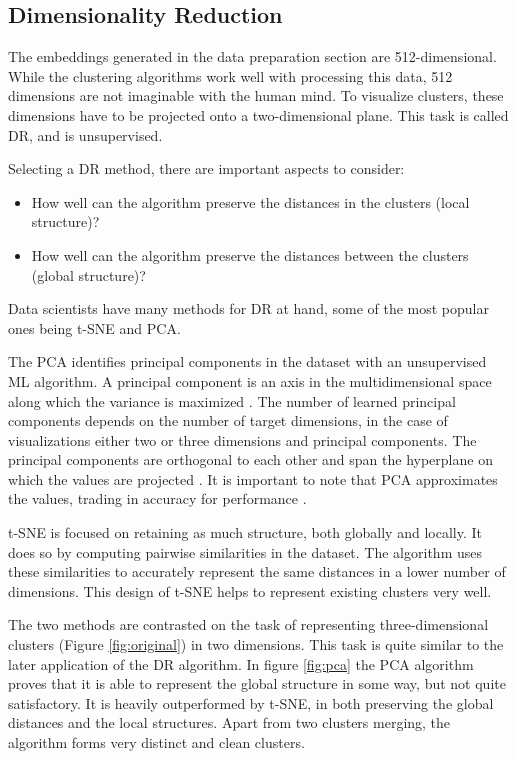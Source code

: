 \subsection{Dimensionality Reduction}

The embeddings generated in the data preparation section are 512-dimensional. While the clustering algorithms work well with processing this data, 512 dimensions are not imaginable with the human mind. To visualize clusters, these dimensions have to be projected onto a two-dimensional plane. This task is called \ac{DR}, and is unsupervised. 

Selecting a \ac{DR} method, there are important aspects to consider:
\begin{itemize}
	\item How well can the algorithm preserve the distances in the clusters (local structure)?
	\item How well can the algorithm preserve the distances between the clusters (global structure)?
\end{itemize}

Data scientists have many methods for \ac{DR} at hand, some of the most popular ones being \ac{t-SNE} and \ac{PCA}.

The \ac{PCA} identifies principal components in the dataset with an unsupervised \ac{ML} algorithm.\cite{40algorithms} A principal component is an axis in the multidimensional space along which the variance is maximized \cite{pcaVStsne}. The number of learned principal components depends on the number of target dimensions, in the case of visualizations either two or three dimensions and principal components. The principal components are orthogonal to each other and span the hyperplane on which the values are projected \cite{pcaVStsne}.
It is important to note that \ac{PCA} approximates the values, trading in accuracy for performance \cite{40algorithms}.

\ac{t-SNE} is focused on retaining as much structure, both globally and locally. It does so by computing pairwise similarities in the dataset. The algorithm uses these similarities to accurately represent the same distances in a lower number of dimensions. This design of \ac{t-SNE} helps to represent existing clusters very well.

The two methods are contrasted on the task of representing three-dimensional clusters (Figure \ref{fig:original}) in two dimensions. This task is quite similar to the later application of the \ac{DR} algorithm. In figure \ref{fig:pca} the \ac{PCA} algorithm proves that it is able to represent the global structure in some way, but not quite satisfactory. It is heavily outperformed by \ac{t-SNE}, in both preserving the global distances and the local structures. Apart from two clusters merging, the algorithm forms very distinct and clean clusters.

